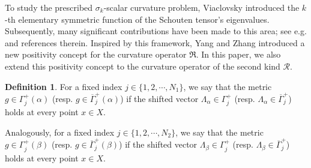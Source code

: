 \documentclass[12pt, twoside]{article}
\theoremstyle{definition}
\newtheorem{definition}[theorem]{Definition}
\numberwithin{equation}{section}
\def\Ga{\Gamma}
\begin{document}
To study the prescribed $\sigma_{k}$-scalar curvature problem, Viaclovsky \cite{Via00} introduced the $k$-th elementary symmetric function of the Schouten tensor's eigenvalues. Subsequently, many significant contributions have been made to this area; see e.g. \cite{GLW04,GLW05,GVW03,GW04} and references therein. Inspired by this framework, Yang and Zhang \cite{YZ25} introduced a new positivity concept for the curvature operator $\mathfrak{R}$. In this paper, we also extend this positivity concept to the curvature operator of the second kind $\mathcal{R}$.
\begin{definition}
For a fixed index $j\in\{1,2,\cdots,N_{1} \}$, we say that the metric $g\in \Gamma^{+}_{j}(\alpha)$ (resp. $g\in\overline{\Ga}^{+}_{j}(\alpha)$) if the shifted vector $\Lambda_{\alpha}\in\Gamma^{+}_{j}$ (resp. $\Lambda_{\alpha}\in\overline{\Ga}^{+}_{j}$) holds at every point $x\in X$.

Analogously, for a fixed index $j\in\{1,2,\cdots,N_{2} \}$, we say that the metric $g\in \Gamma^{+}_{j}(\beta)$ (resp. $g\in\overline{\Ga}^{+}_{j}(\beta)$) if the shifted vector $\Lambda_{\beta}\in\Gamma^{+}_{j}$ (resp. $\Lambda_{\beta}\in\overline{\Ga}^{+}_{j}$) holds at every point $x\in X$.
\end{definition}
\end{document}
